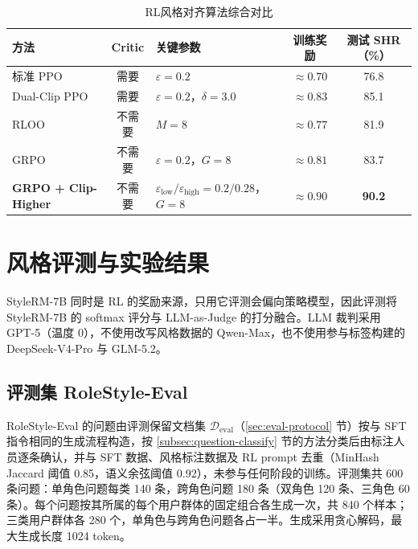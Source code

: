 \documentclass[fontset=fandol,type=master,campus=shenzhen,etitleauto=true]{hithesisbook}
\begin{document}
\begin{table}[htbp]
\centering
\caption{RL风格对齐算法综合对比}
\label{tab:rl-comparison}
\small
\setlength{\tabcolsep}{5pt}
\renewcommand{\arraystretch}{1.15}
\begin{tabular}{l c l c c}
\toprule
\textbf{方法} & \textbf{Critic} & \textbf{关键参数} & \textbf{训练奖励} & \textbf{测试 SHR（\%）} \\
\midrule
标准 PPO & 需要 & $\varepsilon=0.2$ & $\approx 0.70$ & 76.8 \\
Dual-Clip PPO & 需要 & $\varepsilon=0.2$，$\delta=3.0$ & $\approx 0.83$ & 85.1 \\
RLOO & 不需要 & $M=8$ & $\approx 0.77$ & 81.9 \\
GRPO & 不需要 & $\varepsilon=0.2$，$G=8$ & $\approx 0.81$ & 83.7 \\
\textbf{GRPO + Clip-Higher} & 不需要 & $\varepsilon_{\text{low}}/\varepsilon_{\text{high}}=0.2/0.28$，$G=8$ & $\mathbf{\approx 0.90}$ & \textbf{90.2} \\
\bottomrule
\end{tabular}
\end{table}

\section{风格评测与实验结果}\label{ux98ceux683cux8bc4ux6d4bux4f53ux7cfb}

StyleRM-7B 同时是 RL 的奖励来源，只用它评测会偏向策略模型，因此评测将 StyleRM-7B 的 softmax 评分与 LLM-as-Judge 的打分融合。LLM 裁判采用 GPT-5（温度 0），不使用改写风格数据的 Qwen-Max，也不使用参与标签构建的 DeepSeek-V4-Pro 与 GLM-5.2。

\subsection{评测集 RoleStyle-Eval}\label{subsec:scenariostyle-eval}

RoleStyle-Eval 的问题由评测保留文档集 $\mathcal{D}_{\text{eval}}$（\ref{sec:eval-protocol} 节）按与 SFT 指令相同的生成流程构造，按 \ref{subsec:question-classify} 节的方法分类后由标注人员逐条确认，并与 SFT 数据、风格标注数据及 RL prompt 去重（MinHash Jaccard 阈值 0.85，语义余弦阈值 0.92），未参与任何阶段的训练。评测集共 600 条问题：单角色问题每类 140 条，跨角色问题 180 条（双角色 120 条、三角色 60 条）。每个问题按其所属的每个用户群体的固定组合各生成一次，共 840 个样本；三类用户群体各 280 个，单角色与跨角色问题各占一半。生成采用贪心解码，最大生成长度 1024 token。
\end{document}
